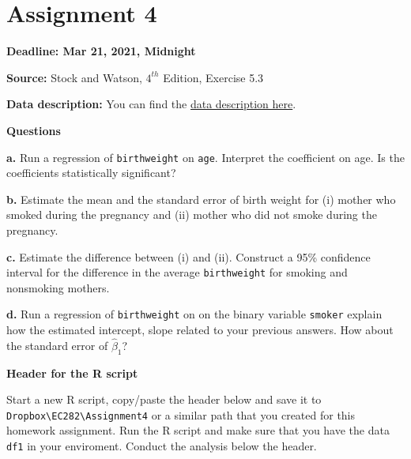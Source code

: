 \documentclass[
]{book}
\begin{document}
\hypertarget{assignment-4}{%
\section{Assignment 4}\label{assignment-4}}

\textbf{Deadline: Mar 21, 2021, Midnight}

\textbf{Source:} Stock and Watson, \(4^{th}\) Edition, Exercise 5.3

\textbf{Data description:} You can find the \href{https://www.dropbox.com/s/s0q564v6lplbexu/Birthweight_Smoking_Description.pdf?dl=1}{data description here}.

\textbf{Questions}

\textbf{a.} Run a regression of \texttt{birthweight} on \texttt{age}. Interpret the coefficient on age. Is the coefficients statistically significant?

\textbf{b.} Estimate the mean and the standard error of birth weight for (i) mother who smoked during the pregnancy and (ii) mother who did not smoke during the pregnancy.

\textbf{c.} Estimate the difference between (i) and (ii). Construct a 95\% confidence interval for the difference in the average \texttt{birthweight} for smoking and nonsmoking mothers.

\textbf{d.} Run a regression of \texttt{birthweight} on on the binary variable \texttt{smoker} explain how the estimated intercept, slope related to your previous answers. How about the standard error of \(\hat{\beta}_1\)?

\textbf{Header for the R script}

Start a new R script, copy/paste the header below and save it to \texttt{Dropbox\textbackslash{}EC282\textbackslash{}Assignment4} or a similar path that you created for this homework assignment. Run the R script and make sure that you have the data \texttt{df1} in your enviroment. Conduct the analysis below the header.
\end{document}
